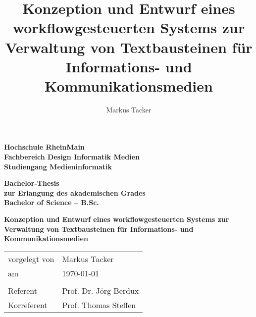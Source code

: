 \documentclass[11pt,a4paper]{article}
\begin{document}
\setmainfont[Mapping=tex-text]{ITC Stone Sans Std}





\author{Markus Tacker}
\title{Konzeption und Entwurf eines workflowgesteuerten Systems zur Verwaltung von Textbausteinen für Informations- und Kommunikationsmedien}

\begin{center}

\begin{small}

\textbf{Hochschule RheinMain\\Fachbereich Design Informatik Medien\\Studiengang Medieninformatik}

\vspace{1cm}

\textbf{Bachelor-Thesis\\zur Erlangung des akademischen Grades\\Bachelor of Science – B.Sc.}

\end{small}

\vspace{2cm}

\begin{huge}

\textbf{Konzeption und Entwurf eines workflowgesteuerten Systems zur Verwaltung von Textbausteinen für Informations- und Kommunikationsmedien}

\end{huge}

\end{center}

\setmainfont[Mapping=tex-text,BoldFont={Vollkorn-Bold},ItalicFont={Vollkorn-Italic},BoldItalicFont={Vollkorn-Bold Italic}]{Vollkorn}
\setsansfont[Mapping=tex-text]{ITC Stone Sans Std}

\vspace{8cm}

\begin{tabular}{@{}l l}
vorgelegt von & Markus Tacker\\
am & \today\\
& \\
Referent & Prof. Dr. Jörg Berdux\\
Korreferent & Prof. Thomas Steffen
\end{tabular}

\pagebreak
\end{document}
